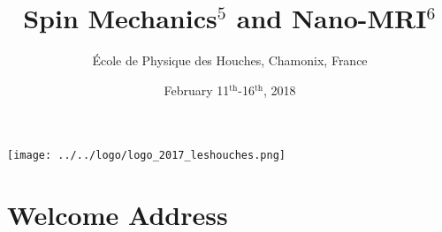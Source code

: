\documentclass[12pt]{book}
\title{Spin Mechanics$^5$ and Nano-MRI$^6$}
\author{\'Ecole de Physique des Houches, Chamonix, France}
\date{February 11$^\text{th}$-16$^\text{th}$, 2018}
\begin{document}
\frontmatter
\hspace{2cm}
\texttt{[image: ../../logo/logo\_2017\_leshouches.png]}

\hspace{2cm}

\maketitle

\chapter{Welcome Address}


\tableofcontents

\newpage

\newpage



\mainmatter
\end{document}
